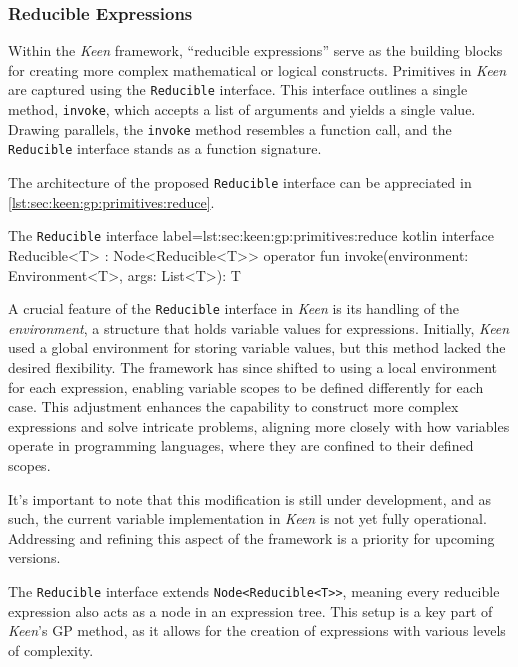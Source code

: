 \subsubsection{Reducible Expressions}
    Within the \textit{Keen} framework, \enquote{reducible expressions} serve as the building blocks for creating more
    complex mathematical or logical constructs. Primitives in \textit{Keen} are captured using the \texttt{Reducible}
    interface. This interface outlines a single method, \texttt{invoke}, which accepts a list of arguments and yields a 
    single value. Drawing parallels, the \texttt{invoke} method resembles a function call, and the \texttt{Reducible} 
    interface stands as a function signature.

    The architecture of the proposed \texttt{Reducible} interface can be appreciated in
    \vref{lst:sec:keen:gp:primitives:reduce}.

    \begin{code}{
        The \texttt{Reducible} interface
    }{
        label=lst:sec:keen:gp:primitives:reduce
    }{kotlin}
        interface Reducible<T> : Node<Reducible<T>> {
            operator fun invoke(environment: Environment<T>, args: List<T>): T
        }
    \end{code}
    
    \begin{remark}
        A crucial feature of the \texttt{Reducible} interface in \textit{Keen} is its handling of the 
        \emph{environment}, a structure that holds variable values for expressions. Initially, \textit{Keen} used a 
        global environment for storing variable values, but this method lacked the desired flexibility. The framework 
        has since shifted to using a local environment for each expression, enabling variable scopes to be defined 
        differently for each case. This adjustment enhances the capability to construct more complex expressions and 
        solve intricate problems, aligning more closely with how variables operate in programming languages, where they 
        are confined to their defined scopes.

        It's important to note that this modification is still under development, and as such, the current variable 
        implementation in \textit{Keen} is not yet fully operational. Addressing and refining this aspect of the 
        framework is a priority for upcoming versions.
    \end{remark}
    
    The \texttt{Reducible} interface extends \texttt{Node<Reducible<T>>}, meaning every reducible expression also acts 
    as a node in an expression tree. This setup is a key part of \textit{Keen}'s GP method, as it allows for the 
    creation of expressions with various levels of complexity.

